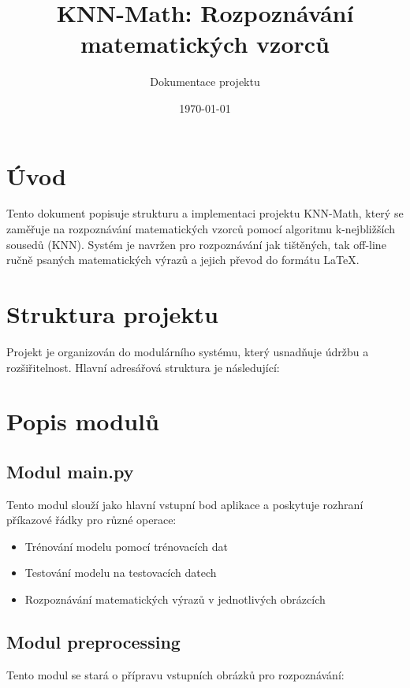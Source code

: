 \documentclass[12pt,a4paper]{article}
\title{KNN-Math: Rozpoznávání matematických vzorců}
\author{Dokumentace projektu}
\date{\today}
\begin{document}
\maketitle

\tableofcontents
\newpage

\section{Úvod}

Tento dokument popisuje strukturu a implementaci projektu KNN-Math, který se zaměřuje na rozpoznávání matematických vzorců pomocí algoritmu k-nejbližších sousedů (KNN). Systém je navržen pro rozpoznávání jak tištěných, tak off-line ručně psaných matematických výrazů a jejich převod do formátu LaTeX.

\section{Struktura projektu}

Projekt je organizován do modulárního systému, který usnadňuje údržbu a rozšiřitelnost. Hlavní adresářová struktura je následující:



\section{Popis modulů}

\subsection{Modul main.py}

Tento modul slouží jako hlavní vstupní bod aplikace a poskytuje rozhraní příkazové řádky pro různé operace:
\begin{itemize}
    \item Trénování modelu pomocí trénovacích dat
    \item Testování modelu na testovacích datech
    \item Rozpoznávání matematických výrazů v jednotlivých obrázcích
\end{itemize}

\subsection{Modul preprocessing}

Tento modul se stará o přípravu vstupních obrázků pro rozpoznávání:
\end{document}
